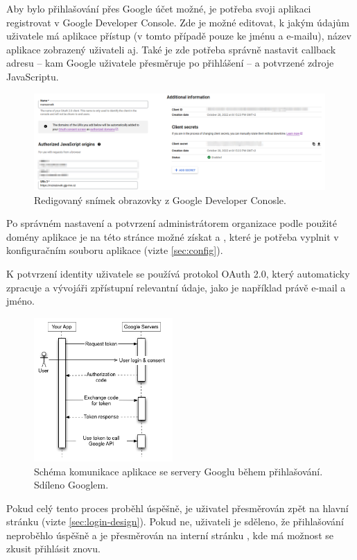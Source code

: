 Aby bylo přihlašování přes Google účet možné, je potřeba svoji aplikaci registrovat v Google Developer Console. Zde je možné editovat, k jakým údajům uživatele má aplikace přístup (v tomto případě pouze ke jménu a e-mailu), název aplikace zobrazený uživateli aj. Také je zde potřeba správně nastavit callback adresu -- kam Google uživatele přesměruje po přihlášení -- a potvrzené zdroje JavaScriptu.

\begin{figure}[H]
    \centering
    \includegraphics[width=420px]{images/02technologie/google-console.png}
    \caption{Redigovaný snímek obrazovky z Google Developer Conosle.}
\end{figure}

Po správném nastavení a potvrzení administrátorem organizace podle použité domény aplikace je na této stránce možné získat  a , které je potřeba vyplnit v konfiguračním souboru aplikace (vizte \ref{sec:config}).

K potvrzení identity uživatele se používá protokol OAuth 2.0, který  automaticky zpracuje a vývojáři zpřístupní relevantní údaje, jako je například právě e-mail a jméno.

\begin{figure}[H]
    \centering
    \includegraphics[width=200px]{images/02technologie/google-auth.png}
    \caption{Schéma komunikace aplikace se servery Googlu během přihlašování. Sdíleno Googlem. \cite{google-auth}}
\end{figure}

Pokud celý tento proces proběhl úspěšně, je uživatel přesměrován zpět na hlavní stránku (vizte \ref{sec:login-design}). Pokud ne, uživateli je sděleno, že přihlašování neproběhlo úspěšně a je přesměrován na interní stránku , kde má možnost se zkusit přihlásit znovu.

